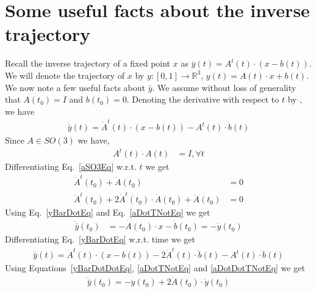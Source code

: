 \documentclass{elsart5p}
\begin{document}
\section{Some useful facts about the inverse trajectory} \label{invTrajSec}

Recall the inverse trajectory of a fixed point $x$  as $\bar{y}(t) = A^t(t) \cdot (x - b(t))$.
We will denote the trajectory of $x$ by $y:[0,1] \to \mathbb{R}^3$, $y(t) = A(t) \cdot x + b(t)$.  We now note a few useful facts about $\bar{y}$. 
We assume without loss of generality that $A(t_0) = I$ and $b(t_0)=0$.  Denoting the derivative with respect to $t$ by $\dot{}$, we have
\begin{align}
\dot{\bar{y}}(t)=\dot{A}^t(t) \cdot (x-b(t)) - A^t(t) \cdot \dot{b}(t)	\label{yBarDotEq}
\end{align}
Since $A \in SO(3)$ we have,
\begin{align}
 A^t(t) \cdot A(t) &= I, \forall t 	\label{aSO3Eq}
\end{align}
Differentiating Eq.~\ref{aSO3Eq} w.r.t. $t$ we get
\begin{align}
\dot{A}^t(t_0) + \dot{A}(t_0) &= 0			\label{aDotTNotEq} \\
\ddot{A}^t(t_0) + 2\dot{A}^t(t_0) \cdot \dot{A}(t_0) + \ddot{A}(t_0) &=0		\label{aDotDotTNotEq}
\end{align}
Using Eq.~\ref{yBarDotEq} and Eq.~\ref{aDotTNotEq} we get
\begin{align}
\dot{\bar{y}}(t_0) &= -\dot{A}(t_0) \cdot x - \dot{b}(t_0) = -\dot{y}(t_0)		\label{yBarDotTNotEq} 
\end{align}
Differentiating Eq.~\ref{yBarDotEq} w.r.t. time we get
\begin{align}
\ddot{\bar{y}}(t) = \ddot{A}^t(t) \cdot (x-b(t)) - 2\dot{A}^t(t) \cdot \dot{b}(t) - A^t(t) \cdot \ddot{b}(t) 	\label{yBarDotDotEq}
\end{align}
Using Equations~\ref{yBarDotDotEq}, \ref{aDotTNotEq} and \ref{aDotDotTNotEq} we get
\begin{align}
 \ddot{\bar{y}}(t_0) = -\ddot{y}(t_0) + 2\dot{A}(t_0) \cdot \dot{y}(t_0)		\label{yBarDotDotTNotEq}
\end{align}
\end{document}
